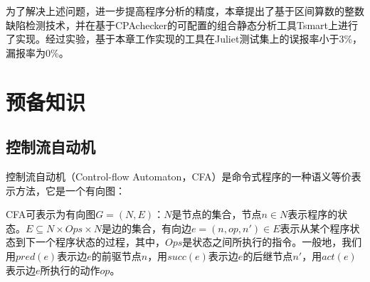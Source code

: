 为了解决上述问题，进一步提高程序分析的精度，本章提出了基于区间算数的整数缺陷检测技术，并在基于CPAchecker\cite{beyer2007configurable}的可配置的组合静态分析工具Tsmart上进行了实现。经过实验，基于本章工作实现的工具在Juliet测试集上的误报率小于3\%，漏报率为0\%。

\section{预备知识}

%

\subsection{控制流自动机}
\label{sec:控制流自动机}

控制流自动机（Control-flow Automaton，CFA）是命令式程序的一种语义等价表示方法，它是一个有向图：
\begin{definition}
	CFA可表示为有向图$ G = (N, E) $：$ N $是节点的集合，节点$ n \in N $表示程序的状态。$ E \subseteq N \times Ops \times N $是边的集合，有向边$ e = (n, op, n') \in E $表示从某个程序状态到下一个程序状态的过程，其中，$ Ops $是状态之间所执行的指令。一般地，我们用$ pred(e) $表示边$ e $的前驱节点$ n $，用$ succ(e) $表示边$ e $的后继节点$ n' $，用$ act(e) $表示边$ e $所执行的动作$ op $。
\end{definition}

